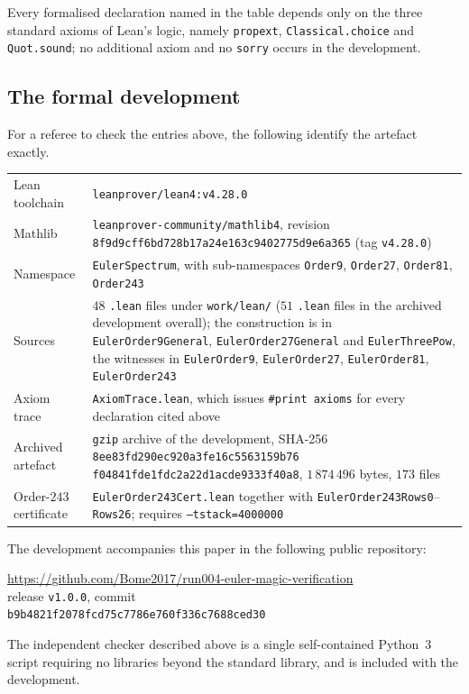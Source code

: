 \documentclass[11pt,a4paper]{amsart}
\theoremstyle{plain}
\theoremstyle{definition}
\theoremstyle{remark}
\begin{document}
Every formalised declaration named in the table depends only on the three
standard axioms of Lean's logic, namely \texttt{propext},
\texttt{Classical.choice} and \texttt{Quot.sound}; no additional axiom and no
\texttt{sorry} occurs in the development.

\subsection*{The formal development}

For a referee to check the entries above, the following identify the artefact
exactly.

\begin{center}\footnotesize
\begin{tabular}{@{}p{}p{}@{}}
\toprule
Lean toolchain & \texttt{leanprover/lean4:v4.28.0}\\
Mathlib & \texttt{leanprover-community/mathlib4}, revision
  \texttt{8f9d9cff6bd728b17a24e163c9402775d9e6a365} (tag \texttt{v4.28.0})\\
Namespace & \texttt{EulerSpectrum}, with sub-namespaces
  \texttt{Order9}, \texttt{Order27}, \texttt{Order81}, \texttt{Order243}\\
Sources & $48$ \texttt{.lean} files under \texttt{work/lean/} ($51$
  \texttt{.lean} files in the archived development overall); the construction is in
  \texttt{EulerOrder9General}, \texttt{EulerOrder27General} and
  \texttt{EulerThreePow}, the witnesses in \texttt{EulerOrder9},
  \texttt{EulerOrder27}, \texttt{EulerOrder81}, \texttt{EulerOrder243}\\
Axiom trace & \texttt{AxiomTrace.lean}, which issues
  \texttt{\#print axioms} for every declaration cited above\\
Archived artefact & \texttt{gzip} archive of the development,
  SHA-256 \texttt{8ee83fd290ec920a3fe16c5563159b76} \texttt{f04841fde1fdc2a22d1acde9333f40a8},
  $1\,874\,496$ bytes, $173$ files\\
Order-$243$ certificate & \texttt{EulerOrder243Cert.lean} together with
  \texttt{EulerOrder243Rows0}--\texttt{Rows26}; requires
  \texttt{--tstack=4000000}\\
\bottomrule
\end{tabular}
\end{center}

The development accompanies this paper in the following public repository:
\begin{center}\small
\url{https://github.com/Bome2017/run004-euler-magic-verification}\\
release \texttt{v1.0.0}, commit\\
\texttt{b9b4821f2078fcd75c7786e760f336c7688ced30}
\end{center}
The independent checker described above is a single self-contained Python~3
script requiring no libraries beyond the standard library, and is included
with the development.
\end{document}
